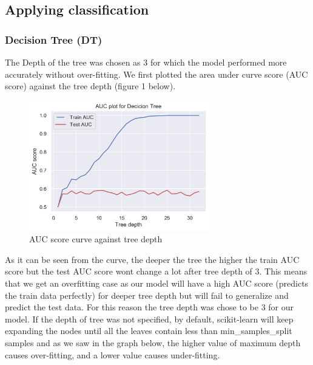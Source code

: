 \subsection{Applying classification}


\subsubsection{Decision Tree (DT)}
The Depth of the tree was chosen as 3 for which the model performed more accurately without over-fitting. We first plotted the area under curve score (AUC score) against the tree depth (figure 1 below).
\begin{figure}[!ht]
 \centering
\includegraphics[width=3.1in]{assignment2/1-3-DecisionTree_AUC.png}
\caption{\label{fig:fig1}AUC score curve against tree depth}
\end{figure}
As it can be seen from the curve, the deeper the tree the higher the train AUC score but the test AUC score wont change a lot after tree depth of 3. This means that we get an overfitting case as our model will have a high AUC score (predicts the train data perfectly) for deeper tree depth but will fail to generalize and predict the test data. For this reason the tree depth was chose to be 3 for our model.
If the depth of tree was not specified, by default, scikit-learn will keep expanding the nodes until all the leaves contain less than min\_samples\_split samples and as we saw in the graph below, the higher value of maximum depth causes over-fitting, and a lower value causes under-fitting\cite{ref_url1}.




